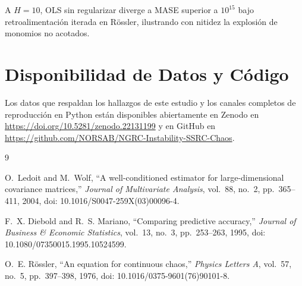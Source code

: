 \documentclass[aip,cha,reprint,amsmath,amssymb]{revtex4-2}
\begin{document}
A $H=10$, OLS sin regularizar diverge a MASE superior a $10^{15}$ bajo retroalimentación iterada en R\"ossler, ilustrando con nitidez la explosión de monomios no acotados.

\section*{Disponibilidad de Datos y Código}
Los datos que respaldan los hallazgos de este estudio y los canales completos de reproducción en Python están disponibles abiertamente en Zenodo en \url{https://doi.org/10.5281/zenodo.22131199} y en GitHub en \url{https://github.com/NORSAB/NGRC-Instability-SSRC-Chaos}.

\begin{thebibliography}{9}

O.~Ledoit and M.~Wolf, ``A well-conditioned estimator for large-dimensional covariance matrices,'' \emph{Journal of Multivariate Analysis}, vol.~88, no.~2, pp.~365--411, 2004, doi: 10.1016/S0047-259X(03)00096-4.

F.~X. Diebold and R.~S. Mariano, ``Comparing predictive accuracy,'' \emph{Journal of Business \& Economic Statistics}, vol.~13, no.~3, pp.~253--263, 1995, doi: 10.1080/07350015.1995.10524599.

O.~E. R{\"o}ssler, ``An equation for continuous chaos,'' \emph{Physics Letters A}, vol.~57, no.~5, pp.~397--398, 1976, doi: 10.1016/0375-9601(76)90101-8.

\end{thebibliography}
\end{document}
